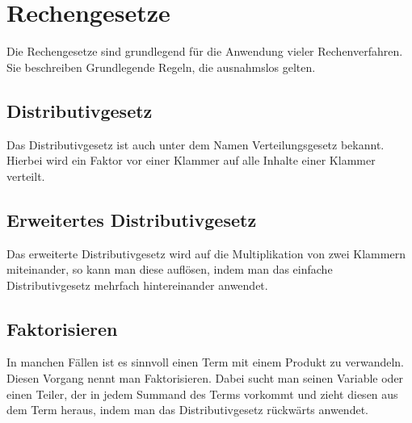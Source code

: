 \section{Rechengesetze}
Die Rechengesetze sind grundlegend für die Anwendung vieler Rechenverfahren. Sie beschreiben Grundlegende Regeln, die ausnahmslos gelten.
\subsection{Distributivgesetz}
Das Distributivgesetz ist auch unter dem Namen Verteilungsgesetz bekannt. Hierbei wird ein Faktor vor einer Klammer auf alle Inhalte einer Klammer verteilt. 

\subsection{Erweitertes Distributivgesetz}
Das erweiterte Distributivgesetz wird auf die Multiplikation von zwei Klammern miteinander, so kann man diese auflösen, indem man das einfache Distributivgesetz mehrfach hintereinander anwendet. 


\subsection{Faktorisieren}
In manchen Fällen ist es sinnvoll einen Term mit einem Produkt zu verwandeln. Diesen Vorgang nennt man Faktorisieren. Dabei sucht man seinen Variable oder einen Teiler, der in jedem Summand des Terms vorkommt und zieht diesen aus dem Term heraus, indem man das Distributivgesetz rückwärts anwendet.



